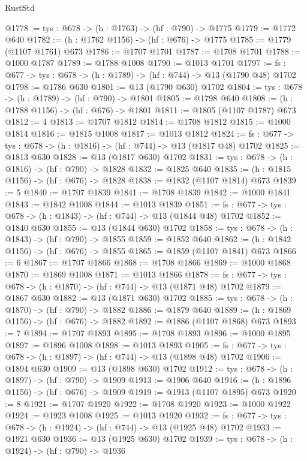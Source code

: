 \begin{lexlean}{RustStd}
\begin{coremodule}
@1778 := {tys : @678} -> (h : @1763) -> (hf : @790) -> @1775
@1779 := @1772 @640
@1782 := (h : @1762 @1156) -> (hf : @676) -> @1775
@1785 := @1779 (@1107 @1761) @673
@1786 := @1707 @1701
@1787 := @1708 @1701
@1788 := @1000 @1787
@1789 := @1788 @1008
@1790 := @1013 @1701
@1797 := {fs : @677} -> {tys : @678} -> (h : @1789) -> (hf : @744) -> @13 (@1790 @48) @1702
@1798 := @1786 @630
@1801 := @13 (@1790 @630) @1702
@1804 := {tys : @678} -> (h : @1789) -> (hf : @790) -> @1801
@1805 := @1798 @640
@1808 := (h : @1788 @1156) -> (hf : @676) -> @1801
@1811 := @1805 (@1107 @1787) @673
@1812 := 4
@1813 := @1707 @1812
@1814 := @1708 @1812
@1815 := @1000 @1814
@1816 := @1815 @1008
@1817 := @1013 @1812
@1824 := {fs : @677} -> {tys : @678} -> (h : @1816) -> (hf : @744) -> @13 (@1817 @48) @1702
@1825 := @1813 @630
@1828 := @13 (@1817 @630) @1702
@1831 := {tys : @678} -> (h : @1816) -> (hf : @790) -> @1828
@1832 := @1825 @640
@1835 := (h : @1815 @1156) -> (hf : @676) -> @1828
@1838 := @1832 (@1107 @1814) @673
@1839 := 5
@1840 := @1707 @1839
@1841 := @1708 @1839
@1842 := @1000 @1841
@1843 := @1842 @1008
@1844 := @1013 @1839
@1851 := {fs : @677} -> {tys : @678} -> (h : @1843) -> (hf : @744) -> @13 (@1844 @48) @1702
@1852 := @1840 @630
@1855 := @13 (@1844 @630) @1702
@1858 := {tys : @678} -> (h : @1843) -> (hf : @790) -> @1855
@1859 := @1852 @640
@1862 := (h : @1842 @1156) -> (hf : @676) -> @1855
@1865 := @1859 (@1107 @1841) @673
@1866 := 6
@1867 := @1707 @1866
@1868 := @1708 @1866
@1869 := @1000 @1868
@1870 := @1869 @1008
@1871 := @1013 @1866
@1878 := {fs : @677} -> {tys : @678} -> (h : @1870) -> (hf : @744) -> @13 (@1871 @48) @1702
@1879 := @1867 @630
@1882 := @13 (@1871 @630) @1702
@1885 := {tys : @678} -> (h : @1870) -> (hf : @790) -> @1882
@1886 := @1879 @640
@1889 := (h : @1869 @1156) -> (hf : @676) -> @1882
@1892 := @1886 (@1107 @1868) @673
@1893 := 7
@1894 := @1707 @1893
@1895 := @1708 @1893
@1896 := @1000 @1895
@1897 := @1896 @1008
@1898 := @1013 @1893
@1905 := {fs : @677} -> {tys : @678} -> (h : @1897) -> (hf : @744) -> @13 (@1898 @48) @1702
@1906 := @1894 @630
@1909 := @13 (@1898 @630) @1702
@1912 := {tys : @678} -> (h : @1897) -> (hf : @790) -> @1909
@1913 := @1906 @640
@1916 := (h : @1896 @1156) -> (hf : @676) -> @1909
@1919 := @1913 (@1107 @1895) @673
@1920 := 8
@1921 := @1707 @1920
@1922 := @1708 @1920
@1923 := @1000 @1922
@1924 := @1923 @1008
@1925 := @1013 @1920
@1932 := {fs : @677} -> {tys : @678} -> (h : @1924) -> (hf : @744) -> @13 (@1925 @48) @1702
@1933 := @1921 @630
@1936 := @13 (@1925 @630) @1702
@1939 := {tys : @678} -> (h : @1924) -> (hf : @790) -> @1936

\end{coremodule}
\end{lexlean}
